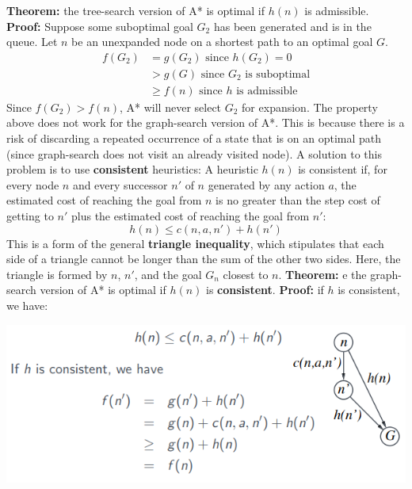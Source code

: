 \textbf{Theorem:} the tree-search version of A* is optimal if $h(n)$ is admissible.\newline\newline
\textbf{Proof:}
Suppose some suboptimal goal $G_2$ has been generated and is in the queue. Let $n$ be an unexpanded node on a shortest path to an optimal goal $G$.
\[
\begin{split}
    f(G_2) & = g(G_2)\,\, \text{since $h(G_2) = 0$}\\
    & > g(G) \,\, \text{since $G_2$ is suboptimal}\\
    & \geq f(n) \,\, \text{since $h$ is admissible}
\end{split}
\]
Since $f(G_2) > f(n)$, A* will never select $G_2$ for expansion.
\newline\newline
The property above does not work for the graph-search version of A*. This is because there is a risk of discarding a repeated occurrence of a state that
is on an optimal path (since graph-search does not visit an already visited node).\newline\newline
A solution to this problem is to use \textbf{consistent} heuristics: A heuristic $h(n)$ is consistent if, for every node $n$ and every successor $n'$ of $n$ generated by any action $a$, the estimated cost of reaching the goal from $n$ is no greater than the step cost of getting to $n'$ plus the estimated cost of reaching the goal from $n'$:
\[h(n) \leq c(n, a, n') + h(n')\]
This is a form of the general \textbf{triangle inequality}, which stipulates that each side of a triangle cannot be longer than the sum of the other two sides. Here, the triangle is formed by $n$, $n'$, and the goal $G_n$ closest to $n$.
\newline\newline
\textbf{Theorem:} e the graph-search version of A* is optimal if $h(n)$ is \textbf{consistent}.\newline\newline
\textbf{Proof:} if $h$ is consistent, we have:
\begin{center}
    \includegraphics[]{images/consistency.png}
\end{center}
